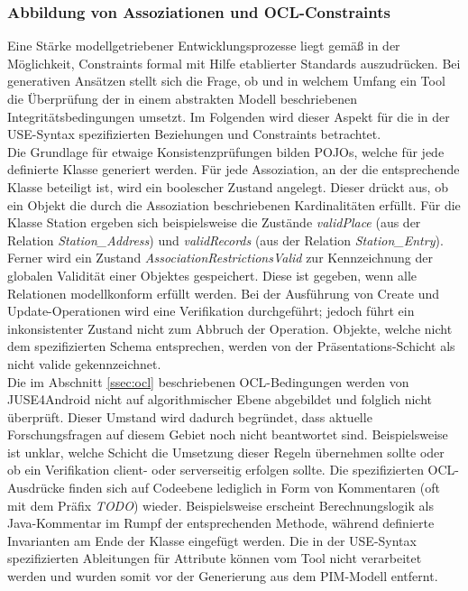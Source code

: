 \documentclass[a4paper,twoside]{article}
\begin{document}
\subsubsection{Abbildung von Assoziationen und OCL-Constraints}
Eine Stärke modellgetriebener Entwicklungsprozesse liegt gemäß \cite{SWOT} in der Möglichkeit, Constraints formal mit Hilfe etablierter Standards auszudrücken. Bei generativen Ansätzen stellt sich die Frage, ob und in welchem Umfang ein Tool die Überprüfung der in einem abstrakten Modell beschriebenen Integritätsbedingungen umsetzt. Im Folgenden wird dieser Aspekt für die in der USE-Syntax spezifizierten Beziehungen und Constraints betrachtet. \\
Die Grundlage für etwaige Konsistenzprüfungen bilden POJOs, welche für jede definierte Klasse generiert werden.  
Für jede Assoziation, an der die entsprechende Klasse beteiligt ist, wird ein boolescher Zustand angelegt. Dieser drückt aus, ob ein Objekt die durch die Assoziation beschriebenen Kardinalitäten erfüllt. Für die Klasse Station ergeben sich beispielsweise die Zustände \textit{validPlace} (aus der Relation \textit{Station\_Address}) und \textit{validRecords} (aus der Relation \textit{Station\_Entry}). Ferner wird ein Zustand \textit{AssociationRestrictionsValid} zur Kennzeichnung der globalen Validität einer Objektes gespeichert. Diese ist gegeben, wenn alle Relationen modellkonform erfüllt werden. Bei der Ausführung von Create und Update-Operationen wird eine Verifikation durchgeführt; jedoch führt ein inkonsistenter Zustand nicht zum Abbruch der Operation. Objekte, welche nicht dem spezifizierten Schema entsprechen, werden von der Präsentations-Schicht als nicht valide gekennzeichnet.\\
Die im Abschnitt \ref{ssec:ocl} beschriebenen OCL-Bedingungen werden von JUSE4Android nicht auf algorithmischer Ebene abgebildet und folglich nicht überprüft. \cite[S.59]{SilvaMasterThesis} Dieser Umstand wird dadurch begründet, dass aktuelle Forschungsfragen auf diesem Gebiet noch nicht beantwortet sind. Beispielsweise ist unklar, welche Schicht die Umsetzung dieser Regeln übernehmen sollte oder ob ein Verifikation client- oder serverseitig erfolgen sollte. \cite[S.107]{SilvaMasterThesis} 
Die spezifizierten OCL-Ausdrücke finden sich auf Codeebene lediglich in Form von Kommentaren (oft mit dem Präfix \textit{TODO}) wieder. Beispielsweise erscheint Berechnungslogik als Java-Kommentar im Rumpf der entsprechenden Methode, während definierte Invarianten am Ende der Klasse eingefügt werden. Die in der USE-Syntax spezifizierten Ableitungen für Attribute können vom Tool nicht verarbeitet werden und wurden somit vor der Generierung aus dem PIM-Modell entfernt. 
\end{document}
